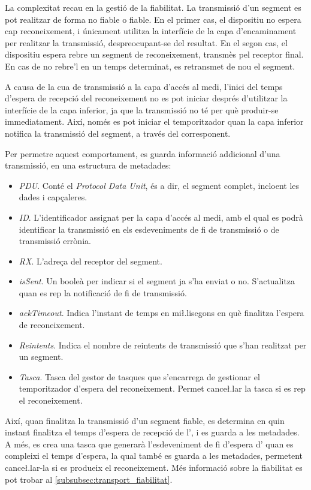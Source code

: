 \documentclass{tfgitic}[2024/07/01]
\begin{document}
{La complexitat recau en la gestió de la fiabilitat. La transmissió d'un segment es pot realitzar de forma no fiable o fiable. En el primer cas, el dispositiu no espera cap reconeixement, i únicament utilitza la interfície de la capa d'encaminament per realitzar la transmissió, despreocupant-se del resultat. En el segon cas, el dispositiu espera rebre un segment de reconeixement, transmès pel receptor final. En cas de no rebre'l en un temps determinat, es retransmet de nou el segment. 

A causa de la cua de transmissió a la capa d'accés al medi, l'inici del temps d'espera de recepció del reconeixement no es pot iniciar després d'utilitzar la interfície de la capa inferior, ja que la transmissió no té per què produir-se immediatament. Així, només es pot iniciar el temporitzador quan la capa inferior notifica la transmissió del segment, a través del  corresponent.

Per permetre aquest comportament, es guarda informació addicional d'una transmissió, en una estructura de metadades:
\begin{itemize}
    \item \emph{PDU}. Conté el \emph{Protocol Data Unit}, és a dir, el segment complet, incloent les dades i capçaleres.
    \item \emph{ID}. L'identificador assignat per la capa d'accés al medi, amb el qual es podrà identificar la transmissió en els esdeveniments de fi de transmissió o de transmissió errònia.
    \item \emph{RX}. L'adreça del receptor del segment.
    \item \emph{isSent}. Un booleà per indicar si el segment ja s'ha enviat o no. S'actualitza quan es rep la notificació de fi de transmissió.
    \item \emph{ackTimeout}. Indica l'instant de temps en mi\l.lisegons en què finalitza l'espera de reconeixement. 
    \item \emph{Reintents}. Indica el nombre de reintents de transmissió que s'han realitzat per un segment.
    \item \emph{Tasca}. Tasca del gestor de tasques que s'encarrega de gestionar el temporitzador d'espera del reconeixement. Permet cance\l.lar la tasca si es rep el reconeixement.
\end{itemize}

Així, quan finalitza la transmissió d'un segment fiable, es determina en quin instant finalitza el temps d'espera de recepció de l', i es guarda a les metadades. A més, es crea una tasca que generarà l'esdeveniment de fi d'espera d' quan es compleixi el temps d'espera, la qual també es guarda a les metadades, permetent cance\l.lar-la si es produeix el reconeixement. Més informació sobre la fiabilitat es pot trobar al \autoref{subsubsec:transport_fiabilitat}.

}
\end{document}
